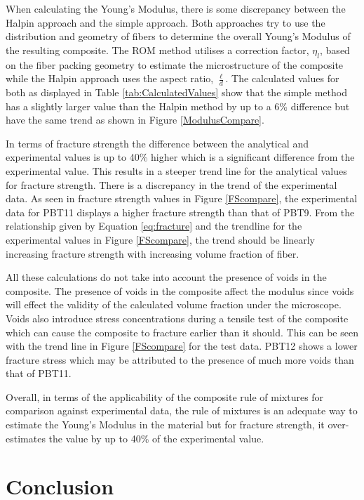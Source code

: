 \documentclass[11pt]{article}
\begin{document}
When calculating the Young's Modulus, there is some discrepancy between the Halpin approach and the simple approach. Both approaches try to use the distribution and geometry of fibers to determine the overall Young's Modulus of the resulting composite. The ROM method utilises a correction factor, \(\eta_l\), based on the fiber packing geometry to estimate the microstructure of the composite while the Halpin approach uses the aspect ratio, \(\frac{\ell}{d}\). The calculated values for both as displayed in Table \ref{tab:CalculatedValues} show that the simple method has a slightly larger value than the Halpin method by up to a 6\% difference but have the same trend as shown in Figure \ref{ModulusCompare}.
\singlespacing

In terms of fracture strength the difference between the analytical and experimental values is up to 40\% higher which is a significant difference from the experimental value. This results in a steeper trend line for the analytical values for fracture strength. There is a discrepancy in the trend of the experimental data. As seen in fracture strength values in Figure \ref{FScompare}, the experimental data for PBT11 displays a higher fracture strength than that of PBT9. From the relationship given by Equation \ref{eq:fracture} and the trendline for the experimental values in Figure \ref{FScompare}, the trend should be linearly increasing fracture strength with increasing volume fraction of fiber.
\singlespacing

All these calculations do not take into account the presence of voids in the composite. The presence of voids in the composite affect the modulus since voids will effect the validity of the calculated volume fraction under the microscope. Voids also introduce stress concentrations during a tensile test of the composite which can cause the composite to fracture earlier than it should. This can be seen with the trend line in Figure \ref{FScompare} for the test data. PBT12 shows a lower fracture stress which may be attributed to the presence of much more voids than that of PBT11.
\singlespacing

Overall, in terms of the applicability of the composite rule of mixtures for comparison against experimental data, the rule of mixtures is an adequate way to estimate the Young's Modulus in the material but for fracture strength, it over-estimates the value by up to 40\% of the experimental value.

\section{Conclusion}
\end{document}
